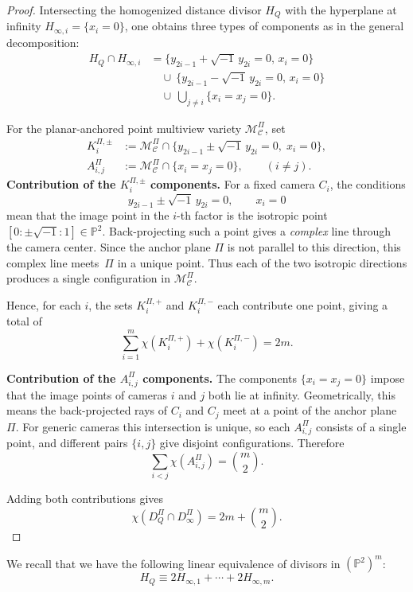 \documentclass{article}
\newcommand{\PP}{\mathbb{P}}
\begin{document}
\begin{proof}
Intersecting the homogenized distance divisor $H_Q$ with the hyperplane at
infinity $H_{\infty,i}=\{x_i=0\}$, one obtains three types of components
as in the general decomposition:
\[
\begin{aligned}
H_Q\cap H_{\infty,i}
&=\{y_{2i-1}+\sqrt{-1}\,y_{2i}=0,\,x_i=0\} \\
&\quad\cup\ \{y_{2i-1}-\sqrt{-1}\,y_{2i}=0,\,x_i=0\} \\
&\quad\cup\ \bigcup_{j\neq i}\{x_i=x_j=0\}.
\end{aligned}
\]

For the planar-anchored point multiview variety $\mathcal{M}^\Pi_{\mathcal C}$, set 
\[
\begin{aligned}
K_{i}^{\Pi,\pm}
&:=\mathcal{M}^\Pi_{\mathcal C}\cap\{y_{2i-1}\pm\sqrt{-1}\,y_{2i}=0,\;x_i=0\},\\
A_{i,j}^{\Pi}
&:=\mathcal{M}^\Pi_{\mathcal C}\cap\{x_i=x_j=0\},
\qquad (i\neq j).
\end{aligned}
\]
\textbf{Contribution of the $K_i^{\Pi,\pm}$ components.}
For a fixed camera $C_i$, the conditions
\[
y_{2i-1}\pm\sqrt{-1}\,y_{2i}=0,\qquad x_i=0
\]
mean that the image point in the $i$-th factor is the isotropic point
\mbox{\([0:\pm \sqrt{-1}:1]\in\PP^2\).}
Back-projecting such a point gives a \emph{complex} line through the camera center. Since the anchor plane $\Pi$ is not parallel to this direction,
this complex line meets~$\Pi$ in a unique point.
Thus each of the two isotropic directions produces a single configuration in $\mathcal{M}^\Pi_{\mathcal C}$.

Hence, for each $i$, the sets $K_i^{\Pi,+}$ and $K_i^{\Pi,-}$ each contribute
one point, giving a total of
\[
\sum_{i=1}^m \chi(K_i^{\Pi,+})+\chi(K_i^{\Pi,-})
=2m.
\]

\textbf{Contribution of the $A_{i,j}^\Pi$ components.}
The components $\{x_i=x_j=0\}$ impose that the image points of cameras $i$ and $j$ both lie at infinity. Geometrically, this means the back-projected rays of
$C_i$ and $C_j$ meet at a point of the anchor plane $\Pi$.
For generic cameras this intersection is unique, so each $A_{i,j}^\Pi$
consists of a single point, and different pairs $\{i,j\}$ give disjoint
configurations. Therefore
\[
\sum_{i<j}\chi(A_{i,j}^\Pi)=\binom{m}{2}.
\]

Adding both contributions gives
\[
\chi(D_Q^\Pi\cap D_\infty^\Pi)
=2m+\binom{m}{2}.
\]
\end{proof}


We recall that we have the following linear equivalence of divisors in $(\mathbb{P}^2)^m$:
\[
H_Q \equiv 2H_{\infty,1} + \cdots + 2H_{\infty,m}.
\]
\end{document}
